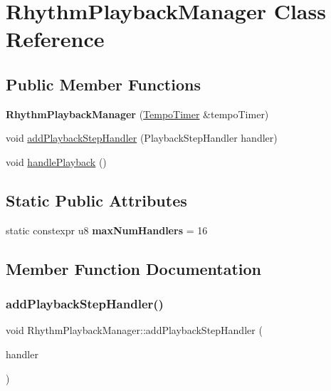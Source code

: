 \hypertarget{class_rhythm_playback_manager}{}\section{Rhythm\+Playback\+Manager Class Reference}
\label{class_rhythm_playback_manager}
\subsection*{Public Member Functions}
\begin{DoxyCompactItemize}
\item 
\mbox{\label{class_rhythm_playback_manager_a13e96de52564f27bfb667033609c184c}} 
{\bfseries Rhythm\+Playback\+Manager} (\mbox{\hyperlink{class_tempo_timer}{Tempo\+Timer}} \&tempo\+Timer)
\item 
void \mbox{\hyperlink{class_rhythm_playback_manager_acd8595875b2be13a91854bc83335c9b8}{add\+Playback\+Step\+Handler}} (Playback\+Step\+Handler handler)
\item 
void \mbox{\hyperlink{class_rhythm_playback_manager_a281c516f6fea01db436b2ecc90dc9087}{handle\+Playback}} ()
\end{DoxyCompactItemize}
\subsection*{Static Public Attributes}
\begin{DoxyCompactItemize}
\item 
\mbox{\label{class_rhythm_playback_manager_abd0d7a2290967cfb5b149d1e5aa998bd}} 
static constexpr u8 {\bfseries max\+Num\+Handlers} = 16
\end{DoxyCompactItemize}


\subsection{Member Function Documentation}
\mbox{\label{class_rhythm_playback_manager_acd8595875b2be13a91854bc83335c9b8}} 
\subsubsection{\texorpdfstring{addPlaybackStepHandler()}{addPlaybackStepHandler()}}
{\footnotesize\ttfamily void Rhythm\+Playback\+Manager\+::add\+Playback\+Step\+Handler (\begin{DoxyParamCaption}\item[{Playback\+Step\+Handler}]{handler }\end{DoxyParamCaption})}

